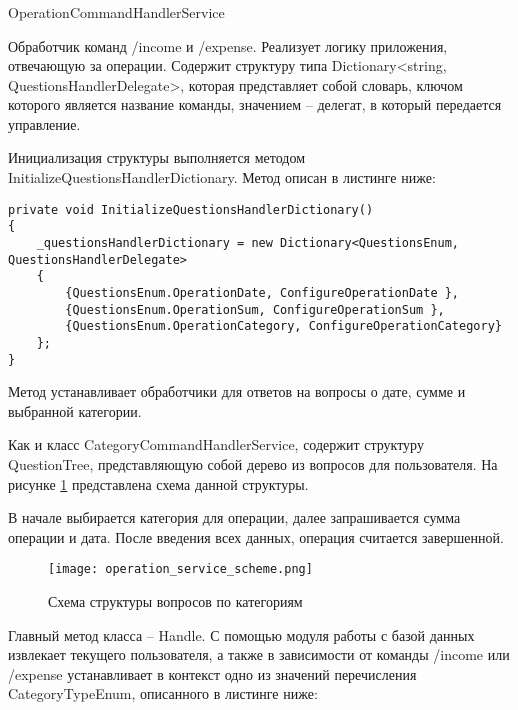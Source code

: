 \vskip 1.2in

\subsubsection{} OperationCommandHandlerService
\label{sec:design:server:OperationCommandHandlerService}

Обработчик команд /income и /expense. Реализует логику приложения,
отвечающую за операции. Содержит структуру типа Dictionary<string,
QuestionsHandlerDelegate>, которая представляет собой словарь, ключом
которого является название команды, значением – делегат, в который
передается управление.

Инициализация структуры выполняется методом \linebreak
InitializeQuestionsHandlerDictionary. Метод описан в листинге ниже:

\lstset{style=sharpc}
\begin{lstlisting}
private void InitializeQuestionsHandlerDictionary()
{
	_questionsHandlerDictionary = new Dictionary<QuestionsEnum, QuestionsHandlerDelegate>
	{
		{QuestionsEnum.OperationDate, ConfigureOperationDate },
		{QuestionsEnum.OperationSum, ConfigureOperationSum },
		{QuestionsEnum.OperationCategory, ConfigureOperationCategory}
	};
}
\end{lstlisting}

Метод устанавливает обработчики для ответов на вопросы о дате, сумме и выбранной категории. 

Как и класс CategoryCommandHandlerService, содержит структуру
\linebreak QuestionTree, представляющую собой дерево из вопросов для пользователя. На рисунке \ref{fig:design:server:operation_service_scheme} представлена схема данной структуры.

В начале выбирается категория для операции, далее запрашивается
сумма операции и дата. После введения всех данных, операция считается завершенной.

\begin{figure}[!h]
\centering
	\texttt{[image: operation\_service\_scheme.png]}
	\caption{Схема структуры вопросов по категориям}
	\label{fig:design:server:operation_service_scheme}
\end{figure}

Главный метод класса – Handle. С помощью модуля работы с базой
данных извлекает текущего пользователя, а также в зависимости от команды /income или /expense устанавливает в контекст одно из значений перечисления CategoryTypeEnum, описанного в листинге ниже:

